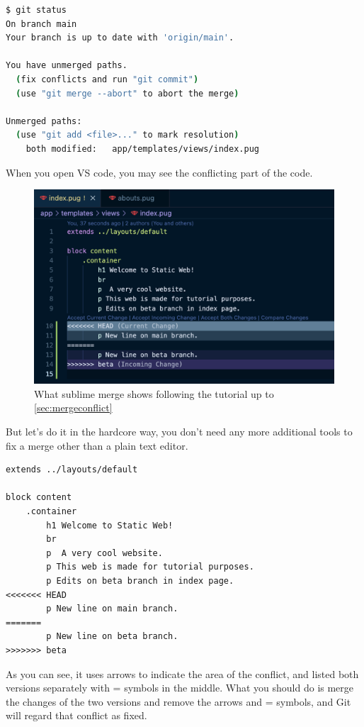 \begin{lstlisting}[language=bash]
$ git status
On branch main
Your branch is up to date with 'origin/main'.

You have unmerged paths.
  (fix conflicts and run "git commit")
  (use "git merge --abort" to abort the merge)

Unmerged paths:
  (use "git add <file>..." to mark resolution)
	both modified:   app/templates/views/index.pug
\end{lstlisting}
\vspace{6mm}

When you open VS code, you may see the conflicting part of the code.
\vspace{6mm}

\begin{figure}[h]
\centering
\includegraphics[width=12cm]{images/ch8-merge-conflict-vscode.png}
\caption{What sublime merge shows following the tutorial up to \cref{sec:mergeconflict}}
\end{figure}

But let's do it in the hardcore way, you don't need any more additional tools to fix a merge other than a plain text editor. 

\begin{lstlisting}[language=pug]
extends ../layouts/default

block content
	.container
		h1 Welcome to Static Web!
		br
		p  A very cool website.
		p This web is made for tutorial purposes.
		p Edits on beta branch in index page.
<<<<<<< HEAD
		p New line on main branch.
=======
		p New line on beta branch.
>>>>>>> beta
\end{lstlisting}
\vspace{6mm}

As you can see, it uses arrows to indicate the area of the conflict, and listed both versions separately with = symbols in the middle. What you should do is merge the changes of the two versions and remove the arrows and = symbols, and Git will regard that conflict as fixed. 

